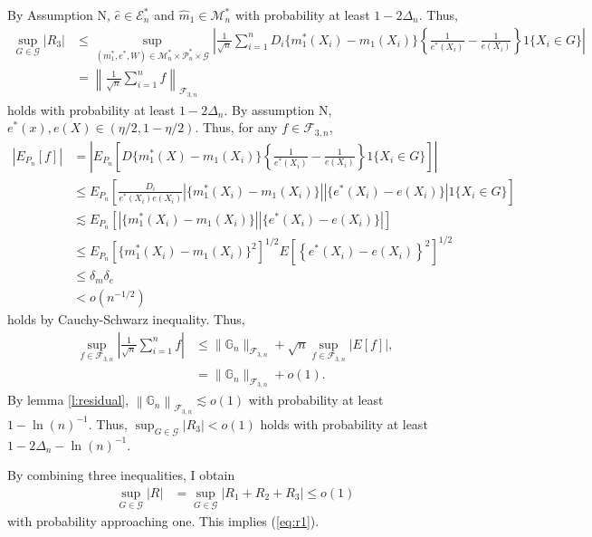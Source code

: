 \documentclass[12pt,oneside,reqno,english]{amsart}
\theoremstyle{definition}
\begin{document}
By Assumption N, 
$\hat{e}\in \mathcal{E}^{*}_{n}$ and $\hat{m}_{1}\in \mathcal{M}^{*}_{n}$
with probability at least $1-2\Delta_{n}$. Thus, 
\begin{align*}
\sup_{G\in \mathcal{G}}|R_{3}| &\leq \sup_{(m_{1}^{*},e^{*},W)\in\mathcal{M}^{*}_{n}\times \mathcal{P}^{*}_{n}\times \mathcal{G}}\left|
\frac{1}{\sqrt{n}}\sum_{i=1}^{n}D_{i}\{m_{1}^{*}(X_{i})-m_{1}(X_{i})\}\left\{\frac{1}{e^{*}(X_{i})}-\frac{1}{e(X_{i})}\right\}1\{X_{i}\in G\}\right|\\
&=\left\|\frac{1}{\sqrt{n}}\sum_{i=1}^{n}f\right\|_{\mathcal{F}_{3,n}}
\end{align*}
holds with probability at least $1-2\Delta_{n}$.
By assumption N, $e^{*}(x),e(X)\in (\eta/2,1-\eta/2)$. Thus, for any $f\in \mathcal{F}_{3,n}$, 
\begin{align*}
|E_{P_{n}}[f]|&=\left|E_{P_{n}}\left[D\{m_{1}^{*}(X)-m_{1}(X_{i})\}\left\{\frac{1}{e^{*}(X_{i})}-\frac{1}{e(X_{i})}\right\}1\{X_{i}\in G\}\right]\right|\\
&\leq E_{P_{n}}\left[\frac{D_{i}}{e^{*}(X_{i})e(X_{i})}\left|\{m_{1}^{*}(X_{i})-m_{1}(X_{i})\}\right|\left| \{e^{*}(X_{i})-e(X_{i})\}\right|1\{X_{i}\in G\}\right]\\
&\lesssim E_{P_{n}}\left[\left|\{m_{1}^{*}(X_{i})-m_{1}(X_{i})\}\right| \left|\{e^{*}(X_{i})-e(X_{i})\}\right|\right]\\
&\leq E_{P_{n}}[\{m_{1}^{*}(X_{i})-m_{1}(X_{i})\}^{2}]^{1/2}E[\left\{e^{*}(X_{i})-e(X_{i})\right\}^{2}]^{1/2}\\
&\leq \delta_{m}\delta_{e}\\
&<o(n^{-1/2})
\end{align*}
holds by Cauchy-Schwarz inequality.
Thus,   
\begin{align*}
\sup_{f\in \mathcal{F}_{3,n}}\left|\frac{1}{\sqrt{n}}\sum_{i=1}^{n}f\right|&\leq \|\mathbb{G}_{n}\|_{\mathcal{F}_{3,n}}+\sqrt{n}\sup_{f\in \mathcal{F}_{3,n}}|E[f]|,\\
&=\|\mathbb{G}_{n}\|_{\mathcal{F}_{3,n}}+o(1).
\end{align*}
By lemma \ref{l:residual}, 
$\left\|\mathbb{G}_{n}\right\|_{\mathcal{F}_{3,n}}\lesssim o(1)$
with probability at least $1-\ln(n)^{-1}$. Thus,  
$\sup_{G\in \mathcal{G}}|R_{3}|<o(1)$ holds with probability at least $1-2\Delta_{n}-\ln(n)^{-1}$. 


By combining three inequalities, I obtain   
\begin{align*}
\sup_{G\in \mathcal{G}}|R|&=\sup_{G\in \mathcal{G}}|R_{1}+R_{2}+R_{3}|\leq o(1)
\end{align*}
with probability approaching one. This implies (\ref{eq:r1}). 
\end{document}
